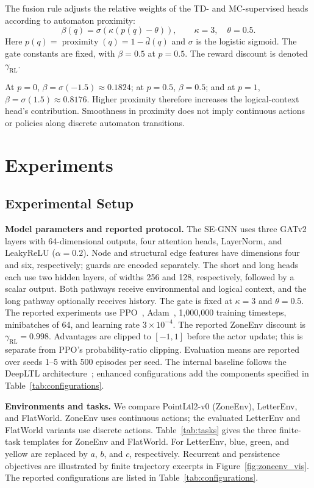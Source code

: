 \documentclass[journal]{IEEEtran}
\begin{document}
The fusion rule adjusts the relative weights of the TD- and MC-supervised heads according to automaton proximity:
\begin{equation}
\beta(q)=\sigma\!\left(\kappa(p(q)-\theta)\right),\qquad
\kappa=3,\quad\theta=0.5.
\label{eq:beta_definition}
\end{equation}
Here $p(q)=\operatorname{proximity}(q)=1-\bar d(q)$ and $\sigma$ is the logistic sigmoid. The gate constants are fixed, with $\beta=0.5$ at $p=0.5$. The reward discount is denoted $\gamma_{\mathrm{RL}}$.

At $p=0$, $\beta=\sigma(-1.5)\approx0.1824$; at $p=0.5$, $\beta=0.5$; and at $p=1$, $\beta=\sigma(1.5)\approx0.8176$. Higher proximity therefore increases the logical-context head's contribution. Smoothness in proximity does not imply continuous actions or policies along discrete automaton transitions.

\section{Experiments}
\label{sec:experiments}

\subsection{Experimental Setup}

	\textbf{Model parameters and reported protocol.} The SE-GNN uses three GATv2 layers with 64-dimensional outputs, four attention heads, LayerNorm, and LeakyReLU ($\alpha=0.2$). Node and structural edge features have dimensions four and six, respectively; guards are encoded separately. The short and long heads each use two hidden layers, of widths 256 and 128, respectively, followed by a scalar output. Both pathways receive environmental and logical context, and the long pathway optionally receives history. The gate is fixed at $\kappa=3$ and $\theta=0.5$. The reported experiments use PPO~\citep{Schulman2017}, Adam~\citep{Kingma2015}, 1{,}000{,}000 training timesteps, minibatches of 64, and learning rate $3\times10^{-4}$. The reported ZoneEnv discount is $\gamma_{\mathrm{RL}}=0.998$. Advantages are clipped to $[-1,1]$ before the actor update; this is separate from PPO's probability-ratio clipping. Evaluation means are reported over seeds 1--5 with 500 episodes per seed. The internal baseline follows the DeepLTL architecture~\citep{deepltl}; enhanced configurations add the components specified in Table~\ref{tab:configurations}.

	\textbf{Environments and tasks.} We compare PointLtl2-v0 (ZoneEnv), LetterEnv, and FlatWorld. ZoneEnv uses continuous actions; the evaluated LetterEnv and FlatWorld variants use discrete actions. Table~\ref{tab:tasks} gives the three finite-task templates for ZoneEnv and FlatWorld. For LetterEnv, blue, green, and yellow are replaced by $a$, $b$, and $c$, respectively. Recurrent and persistence objectives are illustrated by finite trajectory excerpts in Figure~\ref{fig:zoneenv_vis}. The reported configurations are listed in Table~\ref{tab:configurations}.
\end{document}
